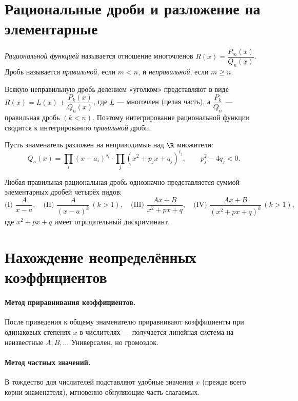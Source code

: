 \section{Рациональные дроби и разложение на элементарные}

\begin{definition}
\emph{Рациональной функцией} называется отношение многочленов $R(x)=\dfrac{P_m(x)}{Q_n(x)}$. Дробь
называется \emph{правильной}, если $m<n$, и \emph{неправильной}, если $m\ge n$.
\end{definition}

\begin{remark}
Всякую неправильную дробь делением «уголком» представляют в виде
$R(x)=L(x)+\dfrac{P_k(x)}{Q_n(x)}$, где $L$ — многочлен (целая часть), а $\dfrac{P_k}{Q_n}$ —
правильная дробь $(k<n)$. Поэтому интегрирование рациональной функции сводится к интегрированию
\emph{правильной} дроби.
\end{remark}

Пусть знаменатель разложен на неприводимые над $\R$ множители:
\[
  Q_n(x)=\prod_i (x-a_i)^{s_i}\cdot\prod_j (x^2+p_j x+q_j)^{t_j},\qquad p_j^2-4q_j<0 .
\]

\begin{theorem}
Любая правильная рациональная дробь однозначно представляется суммой элементарных дробей
четырёх видов:
\[
  \text{(I) }\frac{A}{x-a},\quad
  \text{(II) }\frac{A}{(x-a)^k}\,(k>1),\quad
  \text{(III) }\frac{Ax+B}{x^2+px+q},\quad
  \text{(IV) }\frac{Ax+B}{(x^2+px+q)^k}\,(k>1),
\]
где $x^2+px+q$ имеет отрицательный дискриминант.
\end{theorem}

\section{Нахождение неопределённых коэффициентов}

\paragraph{Метод приравнивания коэффициентов.} После приведения к общему знаменателю
приравнивают коэффициенты при одинаковых степенях $x$ в числителях — получается линейная система
на неизвестные $A,B,\dots$ Универсален, но громоздок.

\paragraph{Метод частных значений.} В тождество для числителей подставляют удобные значения $x$
(прежде всего корни знаменателя), мгновенно обнуляющие часть слагаемых.

